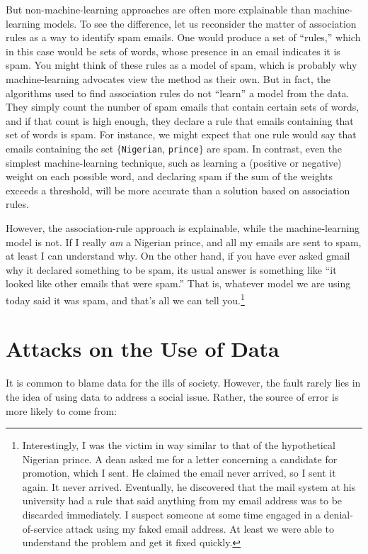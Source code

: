 \documentclass[11pt]{article}
\begin{document}
But non-machine-learning approaches are often more explainable than machine-learning models.  To see the difference, let us reconsider the matter of association rules as a way to identify spam emails.  One would produce a set of ``rules,'' which in this case would be sets of words, whose presence in an email indicates it is spam.  You might think of these rules as a model of spam, which is probably why machine-learning advocates view the method as their own.  But in fact, the algorithms used to find association rules do not ``learn'' a model from the data.  They simply count the number of spam emails that contain certain sets of words, and if that count is high enough, they declare a rule that emails containing that set of words is spam.  For instance, we might expect that one rule would say that emails containing the set $\{${\tt Nigerian}, {\tt prince}$\}$ are spam.  In contrast, even the simplest machine-learning technique, such as learning a (positive or negative) weight on each possible word, and declaring spam if the sum of the weights exceeds a threshold, will be more accurate than a solution based on association rules.

However, the association-rule approach is explainable, while the machine-learning model is not.  If I really {\em am} a Nigerian prince, and all my emails are sent to spam, at least I can understand why.  On the other hand, if you have ever asked gmail why it declared something to be spam, its usual answer is something like ``it looked like other emails that were spam.''  That is, whatever model we are using today said it was spam, and that's all we can tell you.\footnote{Interestingly, I was the victim in way similar to that of the hypothetical Nigerian prince.  A dean asked me for a letter concerning a candidate for promotion, which I sent.  He claimed the email never arrived, so I sent it again.  It never arrived.  Eventually, he discovered that the mail system at his university had a rule that said anything from my email address was to be discarded immediately.  I suspect someone at some time engaged in a denial-of-service attack using my faked email address.  At least we were able to understand the problem and get it fixed quickly.}

\section{Attacks on the Use of Data}

It is common to blame data for the ills of society.  However, the fault rarely lies in the idea of using data to address a social issue.  Rather, the source of error is more likely to come from:
\end{document}
